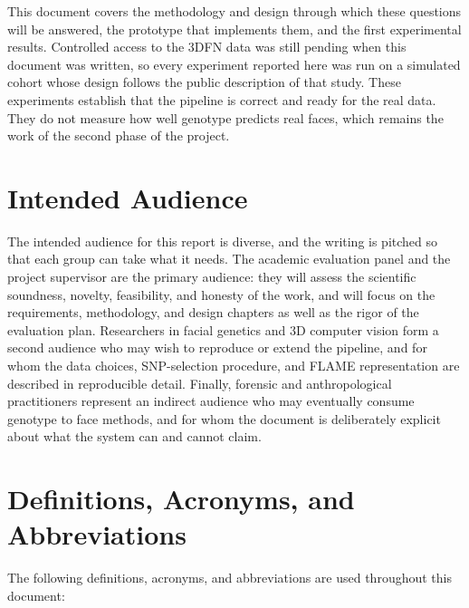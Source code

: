 This document covers the methodology and design through which these questions will be answered, the prototype that implements them, and the first experimental results. Controlled access to the 3DFN data was still pending when this document was written, so every experiment reported here was run on a simulated cohort whose design follows the public description of that study. These experiments establish that the pipeline is correct and ready for the real data. They do not measure how well genotype predicts real faces, which remains the work of the second phase of the project.

\section{Intended Audience}
The intended audience for this report is diverse, and the writing is pitched so that each group can take what it needs. The academic evaluation panel and the project supervisor are the primary audience: they will assess the scientific soundness, novelty, feasibility, and honesty of the work, and will focus on the requirements, methodology, and design chapters as well as the rigor of the evaluation plan. Researchers in facial genetics and 3D computer vision form a second audience who may wish to reproduce or extend the pipeline, and for whom the data choices, SNP-selection procedure, and FLAME representation are described in reproducible detail. Finally, forensic and anthropological practitioners represent an indirect audience who may eventually consume genotype to face methods, and for whom the document is deliberately explicit about what the system can and cannot claim.

\section{Definitions, Acronyms, and Abbreviations}
The following definitions, acronyms, and abbreviations are used throughout this document:

